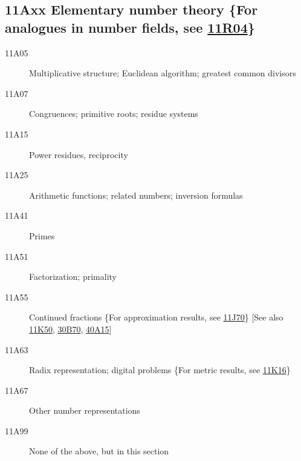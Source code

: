 \documentclass[letterpaper]{article}
\begin{document}
\subsection*{11Axx  Elementary number theory \{For analogues in number fields, see \hyperref[11R04]{11R04}\} }\label{11Axx}
\begin{description} 
\item [11A05]\label{11A05} Multiplicative structure; Euclidean algorithm; greatest common divisors
\item [11A07]\label{11A07} Congruences; primitive roots; residue systems
\item [11A15]\label{11A15} Power residues, reciprocity
\item [11A25]\label{11A25} Arithmetic functions; related numbers; inversion formulas
\item [11A41]\label{11A41} Primes
\item [11A51]\label{11A51} Factorization; primality
\item [11A55]\label{11A55} Continued fractions \{For approximation results, see \hyperref[11J70]{11J70}\} [See also \hyperref[11K50]{11K50}, \hyperref[30B70]{30B70}, \hyperref[40A15]{40A15}]
\item [11A63]\label{11A63} Radix representation; digital problems \{For metric results, see \hyperref[11K16]{11K16}\}
\item [11A67]\label{11A67} Other number representations 
\item [11A99]\label{11A99} None of the above, but in this section
\end{description}
\end{document}
